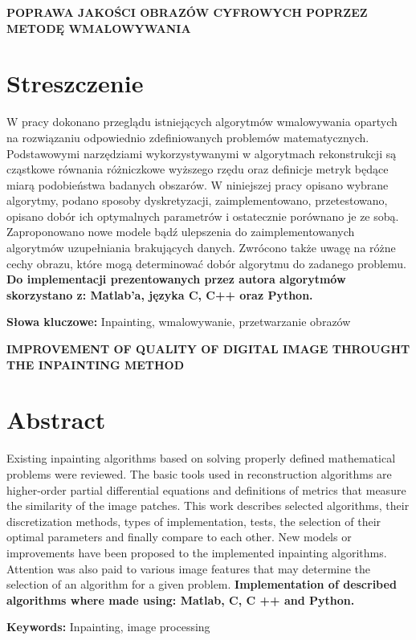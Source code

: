 \newpage
\begin{center}
\large \bf
POPRAWA JAKOŚCI OBRAZÓW CYFROWYCH POPRZEZ METODĘ WMALOWYWANIA
\end{center}
\section*{Streszczenie}
W pracy dokonano przeglądu istniejących algorytmów wmalowywania opartych na rozwiązaniu odpowiednio zdefiniowanych problemów matematycznych. Podstawowymi narzędziami wykorzystywanymi w algorytmach rekonstrukcji są cząstkowe równania różniczkowe wyższego rzędu oraz definicje metryk będące miarą podobieństwa badanych obszarów. W niniejszej pracy opisano wybrane algorytmy, podano sposoby dyskretyzacji, zaimplementowano, przetestowano, opisano dobór ich optymalnych parametrów i ostatecznie porównano je ze sobą. Zaproponowano nowe modele bądź ulepszenia do zaimplementowanych algorytmów uzupełniania brakujących danych. Zwrócono także uwagę na różne cechy obrazu, które mogą determinować dobór algorytmu do zadanego problemu. \textbf{Do implementacji prezentowanych przez autora algorytmów skorzystano z: Matlab'a, języka C, C++ oraz Python.}

\bigskip
{\noindent \bf Słowa kluczowe:} Inpainting, wmalowywanie, przetwarzanie obrazów

\vskip 1cm

\begin{center}
\large \bf
IMPROVEMENT OF QUALITY OF DIGITAL IMAGE THROUGHT THE INPAINTING METHOD
\end{center}

\section*{Abstract}
Existing inpainting algorithms based on solving properly defined mathematical problems were reviewed. The basic tools used in reconstruction algorithms are higher-order partial differential equations and definitions of metrics that measure the similarity of the image patches. This work describes selected algorithms, their discretization methods, types of implementation, tests, the selection of their optimal parameters and finally compare to each other. New models or improvements have been proposed to the implemented inpainting algorithms. Attention was also paid to various image features that may determine the selection of an algorithm for a given problem. \textbf {Implementation of described algorithms where made using: Matlab, C, C ++ and Python.}

\bigskip
{\noindent \bf Keywords:} Inpainting, image processing

\vfill